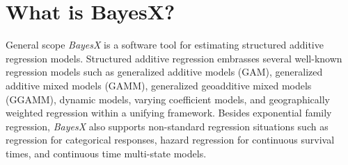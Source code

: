\chapter{What is BayesX?}

\begin{stanza}{General scope}
{\em BayesX} is a software tool for estimating structured additive
regression models. Structured additive regression embrasses
several well-known regression models such as generalized additive
models (GAM), generalized additive mixed models (GAMM),
generalized geoadditive mixed models (GGAMM), dynamic models,
varying coefficient models, and geographically weighted regression
within a unifying framework. Besides exponential family
regression, {\em BayesX} also supports non-standard regression
situations such as regression for categorical responses, hazard
regression for continuous survival times, and continuous time
multi-state models.
\end{stanza}


